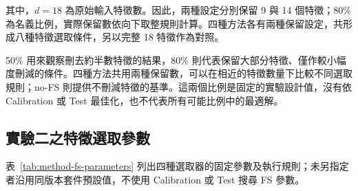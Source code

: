 其中，\(d=18\) 為原始輸入特徵數。因此，兩種設定分別保留 9 與 14 個特徵；80\% 為名義比例，實際保留數依向下取整規則計算。四種方法各有兩種保留設定，共形成八種特徵選取條件，另以完整 18 特徵作為對照。

50\% 用來觀察刪去約半數特徵的結果，80\% 則代表保留大部分特徵、僅作較小幅度刪減的條件。四種方法共用兩種保留數，可以在相近的特徵數量下比較不同選取規則；no-FS 則提供不刪減特徵的基準。這兩個比例是固定的實驗設計值，沒有依 Calibration 或 Test 最佳化，也不代表所有可能比例中的最適解。

\clearpage
\subsection{實驗二之特徵選取參數}\label{sec:method-fs-parameters}

表~\ref{tab:method-fs-parameters} 列出四種選取器的固定參數及執行規則；未另指定者沿用同版本套件預設值，不使用 Calibration 或 Test 搜尋 FS 參數。

